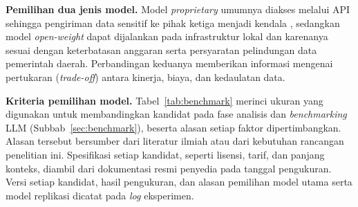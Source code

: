 \textbf{Pemilihan dua jenis model.} Model \textit{proprietary} umumnya diakses melalui API sehingga pengiriman data sensitif ke pihak ketiga menjadi kendala \cite{narayan2022wrangle}, sedangkan model \textit{open-weight} dapat dijalankan pada infrastruktur lokal dan karenanya sesuai dengan keterbatasan anggaran serta persyaratan pelindungan data pemerintah daerah. Perbandingan keduanya memberikan informasi mengenai pertukaran (\textit{trade-off}) antara kinerja, biaya, dan kedaulatan data.

\textbf{Kriteria pemilihan model.} Tabel~\ref{tab:benchmark} merinci ukuran yang digunakan untuk membandingkan kandidat pada fase analisis dan \textit{benchmarking} LLM (Subbab~\ref{sec:benchmark}), beserta alasan setiap faktor dipertimbangkan. Alasan tersebut bersumber dari literatur ilmiah atau dari kebutuhan rancangan penelitian ini. Spesifikasi setiap kandidat, seperti lisensi, tarif, dan panjang konteks, diambil dari dokumentasi resmi penyedia pada tanggal pengukuran. Versi setiap kandidat, hasil pengukuran, dan alasan pemilihan model utama serta model replikasi dicatat pada \textit{log} eksperimen.

